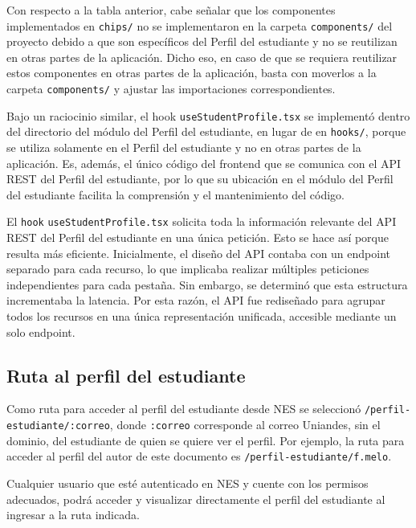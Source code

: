 Con respecto a la tabla anterior, cabe señalar que los componentes implementados en \lstinline|chips/| no se implementaron en la carpeta \lstinline|components/| del proyecto debido a que son específicos del Perfil del estudiante y no se reutilizan en otras partes de la aplicación. Dicho eso, en caso de que se requiera reutilizar estos componentes en otras partes de la aplicación, basta con moverlos a la carpeta \lstinline|components/| y ajustar las importaciones correspondientes.

Bajo un raciocinio similar, el hook \lstinline|useStudentProfile.tsx| se implementó dentro del directorio del módulo del Perfil del estudiante, en lugar de en \lstinline|hooks/|, porque se utiliza solamente en el Perfil del estudiante y no en otras partes de la aplicación. Es, además, el único código del frontend que se comunica con el \gls{API REST} del Perfil del estudiante, por lo que su ubicación en el módulo del Perfil del estudiante facilita la comprensión y el mantenimiento del código.

El \lstinline|hook| \lstinline|useStudentProfile.tsx| solicita toda la información relevante del \gls{API REST} del Perfil del estudiante en una única petición. Esto se hace así porque resulta más eficiente. Inicialmente, el diseño del \gls{API} contaba con un endpoint separado para cada recurso, lo que implicaba realizar múltiples peticiones independientes para cada pestaña. Sin embargo, se determinó que esta estructura incrementaba la latencia. Por esta razón, el \gls{API} fue rediseñado para agrupar todos los recursos en una única representación unificada, accesible mediante un solo endpoint.

\subsection{Ruta al perfil del estudiante}
\label{sec:ruta_perfil_estudiante}

Como ruta para acceder al perfil del estudiante desde \gls{NES} se seleccionó \lstinline|/perfil-estudiante/:correo|, donde \lstinline|:correo| corresponde al correo Uniandes, sin el dominio, del estudiante de quien se quiere ver el perfil. Por ejemplo, la ruta para acceder al perfil del autor de este documento es \lstinline|/perfil-estudiante/f.melo|.

Cualquier usuario que esté autenticado en \gls{NES} y cuente con los permisos adecuados, podrá acceder y visualizar directamente el perfil del estudiante al ingresar a la ruta indicada.

